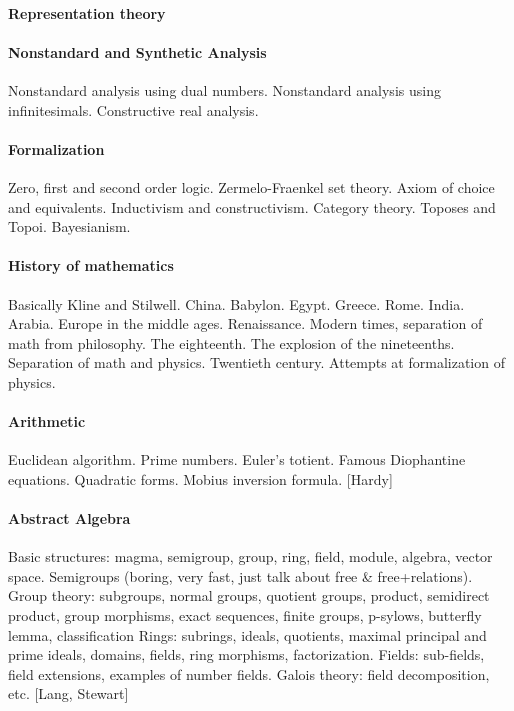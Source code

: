 \paragraph{Representation theory}

\paragraph{Nonstandard and Synthetic Analysis}
Nonstandard analysis using dual numbers.
Nonstandard analysis using infinitesimals.
Constructive real analysis.

\paragraph{Formalization}
Zero, first and second order logic.
Zermelo-Fraenkel set theory.
Axiom of choice and equivalents.
Inductivism and constructivism.
Category theory.
Toposes and Topoi.
Bayesianism.

\paragraph{History of mathematics}
Basically Kline and Stilwell.
China.  Babylon.  Egypt.  Greece.  Rome.  India.  Arabia.
Europe in the middle ages.
Renaissance.  Modern times, separation of math from philosophy.
The eighteenth.  The explosion of the nineteenths.
Separation of math and physics.
Twentieth century.  Attempts at formalization of physics.

\paragraph{Arithmetic}
Euclidean algorithm.
Prime numbers. Euler's totient.
Famous Diophantine equations.
Quadratic forms.
Mobius inversion formula.
[Hardy]

\paragraph{Abstract Algebra}
Basic structures: magma, semigroup, group, ring, field, module, algebra,
vector space.
Semigroups (boring, very fast, just talk about free \& free+relations).
Group theory: subgroups, normal groups, quotient groups, product, semidirect
product, group morphisms, exact sequences, finite groups, p-sylows, butterfly
lemma, classification
Rings: subrings, ideals, quotients, maximal principal and prime ideals,
domains, fields, ring morphisms, factorization.
Fields: sub-fields, field extensions, examples of number fields.
Galois theory: field decomposition, etc.
[Lang, Stewart]

